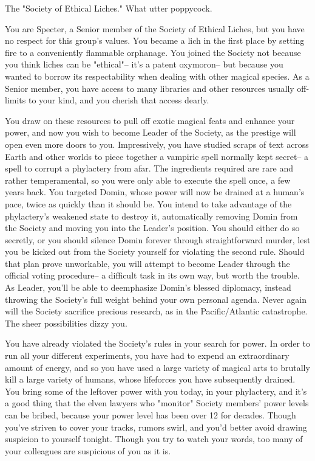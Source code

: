 \documentclass[char]{Sel}
\begin{document}
\name{\cSpecter{}}
The "Society of Ethical Liches." What utter poppycock.

You are Specter, a Senior member of the Society of Ethical Liches, but you have no respect for this group's values. You became a lich in the first place by setting fire to a conveniently flammable orphanage. You joined the Society not because you think liches can be "ethical"-- it's a patent oxymoron-- but because you wanted to borrow its respectability when dealing with other magical species. As a Senior member, you have access to many libraries and other resources usually off-limits to your kind, and you cherish that access dearly.

You draw on these resources to pull off exotic magical feats and enhance your power, and now you wish to become Leader of the Society, as the prestige will open even more doors to you. Impressively, you have studied scraps of text across Earth and other worlds to piece together a vampiric spell normally kept secret-- a spell to corrupt a phylactery from afar. The ingredients required are rare and rather temperamental, so you were only able to execute the spell once, a few years back. You targeted Domin, whose power will now be drained at a human's pace, twice as quickly than it should be. You intend to take advantage of the phylactery's weakened state to destroy it, automatically removing Domin from the Society and moving you into the Leader's position. You should either do so secretly, or you should silence Domin forever through straightforward murder, lest you be kicked out from the Society yourself for violating the second rule. Should that plan prove unworkable, you will attempt to become Leader through the official voting procedure-- a difficult task in its own way, but worth the trouble. As Leader, you'll be able to deemphasize Domin's blessed diplomacy, instead throwing the Society's full weight behind your own personal agenda. Never again will the Society sacrifice precious research, as in the Pacific/Atlantic catastrophe. The sheer possibilities dizzy you.

You have already violated the Society's rules in your search for power. In order to run all your different experiments, you have had to expend an extraordinary amount of energy, and so you have used a large variety of magical arts to brutally kill a large variety of humans, whose lifeforces you have subsequently drained. You bring some of the leftover power with you today, in your phylactery, and it's a good thing that the elven lawyers who "monitor" Society members' power levels can be bribed, because your power level has been over 12 for decades. Though you've striven to cover your tracks, rumors swirl, and you'd better avoid drawing suspicion to yourself tonight. Though you try to watch your words, too many of your colleagues are suspicious of you as it is.
\end{document}
